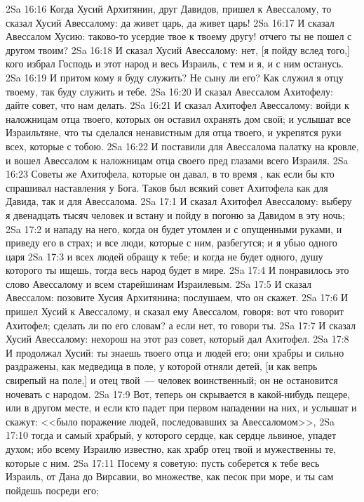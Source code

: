 \vs 2Sa 16:16 Когда Хусий Архитянин, друг Давидов, пришел к Авессалому, то сказал Хусий Авессалому: да живет царь, да живет царь!
\vs 2Sa 16:17 И сказал Авессалом Хусию: таково-то усердие твое к твоему другу! отчего ты не пошел с другом твоим?
\vs 2Sa 16:18 И сказал Хусий Авессалому: нет, [я пойду вслед того,] кого избрал Господь и этот народ и весь Израиль, с тем и я, и с ним останусь.
\vs 2Sa 16:19 И притом кому я буду служить? Не сыну ли его? Как служил я отцу твоему, так буду служить и тебе.
\vs 2Sa 16:20 И сказал Авессалом Ахитофелу: дайте совет, что нам делать.
\vs 2Sa 16:21 И сказал Ахитофел Авессалому: войди к наложницам отца твоего, которых он оставил охранять дом свой; и услышат все Израильтяне, что ты сделался ненавистным для отца твоего, и укрепятся руки всех, которые с тобою.
\vs 2Sa 16:22 И поставили для Авессалома палатку на кровле, и вошел Авессалом к наложницам отца своего пред глазами всего Израиля.
\vs 2Sa 16:23 Советы же Ахитофела, которые он давал, в то время , как если бы кто спрашивал наставления у Бога. Таков был всякий совет Ахитофела как для Давида, так и для Авессалома.
\vs 2Sa 17:1 И сказал Ахитофел Авессалому: выберу я двенадцать тысяч человек и встану и пойду в погоню за Давидом в эту ночь;
\vs 2Sa 17:2 и нападу на него, когда он будет утомлен и с опущенными руками, и приведу его в страх; и все люди, которые с ним, разбегутся; и я убью одного царя
\vs 2Sa 17:3 и всех людей обращу к тебе; и когда не будет одного, душу которого ты ищешь, тогда весь народ будет в мире.
\vs 2Sa 17:4 И понравилось это слово Авессалому и всем старейшинам Израилевым.
\vs 2Sa 17:5 И сказал Авессалом: позовите Хусия Архитянина; послушаем, что он скажет.
\vs 2Sa 17:6 И пришел Хусий к Авессалому, и сказал ему Авессалом, говоря: вот что говорит Ахитофел; сделать ли по его словам? а если нет, то говори ты.
\vs 2Sa 17:7 И сказал Хусий Авессалому: нехорош на этот раз совет, который дал Ахитофел.
\vs 2Sa 17:8 И продолжал Хусий: ты знаешь твоего отца и людей его; они храбры и сильно раздражены, как медведица в поле, у которой отняли детей, [и как вепрь свирепый на поле,] и отец твой~--- человек воинственный; он не остановится ночевать с народом.
\vs 2Sa 17:9 Вот, теперь он скрывается в какой-нибудь пещере, или в другом месте, и если кто падет при первом нападении на них, и услышат и скажут: <<было поражение людей, последовавших за Авессаломом>>,
\vs 2Sa 17:10 тогда и самый храбрый, у которого сердце, как сердце львиное, упадет духом; ибо всему Израилю известно, как храбр отец твой и мужественны те, которые с ним.
\vs 2Sa 17:11 Посему я советую: пусть соберется к тебе весь Израиль, от Дана до Вирсавии, во множестве, как песок при море, и ты сам пойдешь посреди его;
